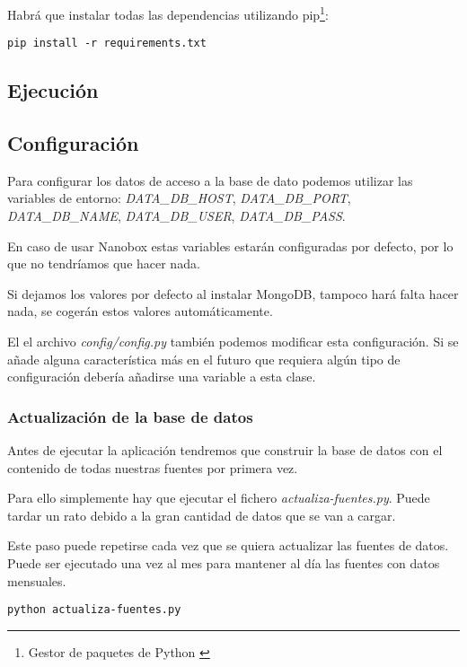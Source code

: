 Habrá que instalar todas las dependencias utilizando pip\footnote{Gestor de paquetes de Python \cite{wiki:pip}}:

\begin{lstlisting}
pip install -r requirements.txt
\end{lstlisting}

\subsection{Ejecución}

\subsection{Configuración}

Para configurar los datos de acceso a la base de dato podemos utilizar las variables de entorno: \textit{DATA\_DB\_HOST}, \textit{DATA\_DB\_PORT}, \textit{DATA\_DB\_NAME}, \textit{DATA\_DB\_USER}, \textit{DATA\_DB\_PASS}.

En caso de usar Nanobox estas variables estarán configuradas por defecto, por lo que no tendríamos que hacer nada.

Si dejamos los valores por defecto al instalar MongoDB, tampoco hará falta hacer nada, se cogerán estos valores automáticamente.

El el archivo \textit{config/config.py} también podemos modificar esta configuración. Si se añade alguna característica más en el futuro que requiera algún tipo de configuración debería añadirse una variable a esta clase.

\subsubsection{Actualización de la base de datos}

Antes de ejecutar la aplicación tendremos que construir la base de datos con el contenido de todas nuestras fuentes por primera vez.

Para ello simplemente hay que ejecutar el fichero \textit{actualiza-fuentes.py}. Puede tardar un rato debido a la gran cantidad de datos que se van a cargar.

Este paso puede repetirse cada vez que se quiera actualizar las fuentes de datos. Puede ser ejecutado una vez al mes para mantener al día las fuentes con datos mensuales.

\begin{lstlisting}
python actualiza-fuentes.py
\end{lstlisting}

